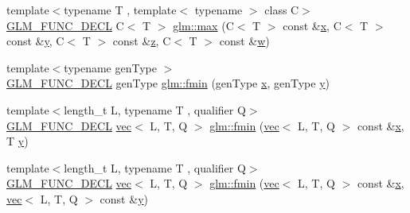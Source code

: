 \begin{DoxyCompactItemize}
\item 
{\footnotesize template$<$typename T , template$<$ typename $>$ class C$>$ }\\\mbox{\hyperlink{setup_8hpp_ab2d052de21a70539923e9bcbf6e83a51}{G\+L\+M\+\_\+\+F\+U\+N\+C\+\_\+\+D\+E\+CL}} C$<$ T $>$ \mbox{\hyperlink{group__gtx__extended__min__max_gaacffbc466c2d08c140b181e7fd8a4858}{glm\+::max}} (C$<$ T $>$ const \&\mbox{\hyperlink{_s_d_l__opengl_8h_ad0e63d0edcdbd3d79554076bf309fd47}{x}}, C$<$ T $>$ const \&\mbox{\hyperlink{_s_d_l__opengl_8h_a1675d9d7bb68e1657ff028643b4037e3}{y}}, C$<$ T $>$ const \&\mbox{\hyperlink{_s_d_l__opengl__glext_8h_a5e74030ebb3297ce1b37ff716fedd68f}{z}}, C$<$ T $>$ const \&\mbox{\hyperlink{_s_d_l__opengl__glext_8h_a6ee8f168a7ab6785a9bb57c6715dad99}{w}})
\item 
{\footnotesize template$<$typename gen\+Type $>$ }\\\mbox{\hyperlink{setup_8hpp_ab2d052de21a70539923e9bcbf6e83a51}{G\+L\+M\+\_\+\+F\+U\+N\+C\+\_\+\+D\+E\+CL}} gen\+Type \mbox{\hyperlink{group__gtx__extended__min__max_gaa3200559611ac5b9b9ae7283547916a7}{glm\+::fmin}} (gen\+Type \mbox{\hyperlink{_s_d_l__opengl_8h_ad0e63d0edcdbd3d79554076bf309fd47}{x}}, gen\+Type \mbox{\hyperlink{_s_d_l__opengl_8h_a1675d9d7bb68e1657ff028643b4037e3}{y}})
\item 
{\footnotesize template$<$length\+\_\+t L, typename T , qualifier Q$>$ }\\\mbox{\hyperlink{setup_8hpp_ab2d052de21a70539923e9bcbf6e83a51}{G\+L\+M\+\_\+\+F\+U\+N\+C\+\_\+\+D\+E\+CL}} \mbox{\hyperlink{structglm_1_1vec}{vec}}$<$ L, T, Q $>$ \mbox{\hyperlink{group__gtx__extended__min__max_gae989203363cff9eab5093630df4fe071}{glm\+::fmin}} (\mbox{\hyperlink{structglm_1_1vec}{vec}}$<$ L, T, Q $>$ const \&\mbox{\hyperlink{_s_d_l__opengl_8h_ad0e63d0edcdbd3d79554076bf309fd47}{x}}, T \mbox{\hyperlink{_s_d_l__opengl_8h_a1675d9d7bb68e1657ff028643b4037e3}{y}})
\item 
{\footnotesize template$<$length\+\_\+t L, typename T , qualifier Q$>$ }\\\mbox{\hyperlink{setup_8hpp_ab2d052de21a70539923e9bcbf6e83a51}{G\+L\+M\+\_\+\+F\+U\+N\+C\+\_\+\+D\+E\+CL}} \mbox{\hyperlink{structglm_1_1vec}{vec}}$<$ L, T, Q $>$ \mbox{\hyperlink{group__gtx__extended__min__max_ga7c42e93cd778c9181d1cdeea4d3e43bd}{glm\+::fmin}} (\mbox{\hyperlink{structglm_1_1vec}{vec}}$<$ L, T, Q $>$ const \&\mbox{\hyperlink{_s_d_l__opengl_8h_ad0e63d0edcdbd3d79554076bf309fd47}{x}}, \mbox{\hyperlink{structglm_1_1vec}{vec}}$<$ L, T, Q $>$ const \&\mbox{\hyperlink{_s_d_l__opengl_8h_a1675d9d7bb68e1657ff028643b4037e3}{y}})

\end{DoxyCompactItemize}
